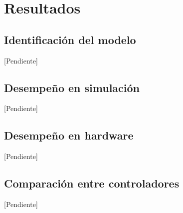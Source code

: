 \chapter{Resultados}
\label{cap:resultados}

\section{Identificación del modelo}
[Pendiente]

\section{Desempeño en simulación}
[Pendiente]

\section{Desempeño en hardware}
[Pendiente]

\section{Comparación entre controladores}
[Pendiente]
